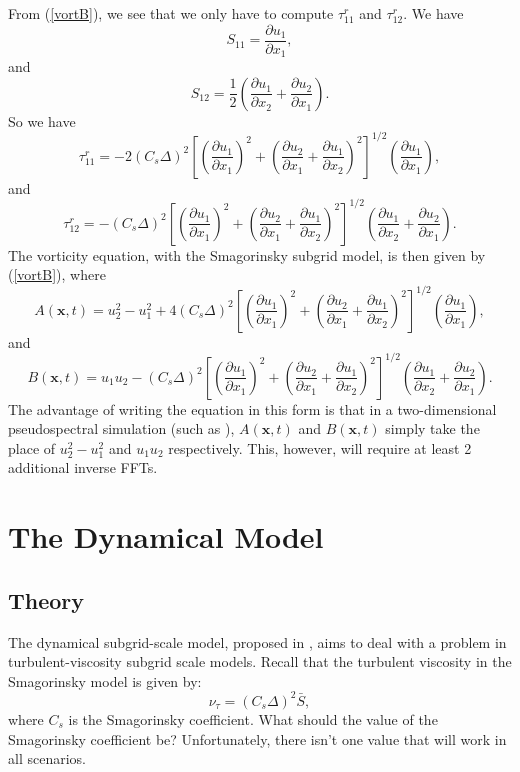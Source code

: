 \documentclass[11pt,a4paper]{article}
\newcommand{\eq}[1]{(\ref{#1})}
\begin{document}
From \eq{vortB}, we see that we only have to compute $\tau^r_{11}$ and $\tau^r_{12}$. We have 
$${S}_{11} = \frac{\partial {u}_1}{\partial x_1},$$
and
$${S}_{12} = \frac{1}{2}\left( \frac{\partial {u}_1}{\partial x_2} + \frac{\partial {u}_2}{\partial x_1}\right).$$
So we have
\begin{equation}\label{tau11}
\tau_{11}^r= -2(C_s \Delta)^2\left[\left( \frac{\partial {u}_1}{\partial x_1}\right)^2+\left( \frac{\partial {u}_2}{\partial x_1} + \frac{\partial {u}_1}{\partial x_2}\right)^2 \right]^{1/2}\left(\frac{\partial {u}_1}{\partial x_1}\right),
\end{equation}
and
\begin{equation}\label{tau12}
\tau_{12}^r= -(C_s \Delta)^2\left[\left( \frac{\partial {u}_1}{\partial x_1}\right)^2+\left( \frac{\partial {u}_2}{\partial x_1} + \frac{\partial {u}_1}{\partial x_2}\right)^2 \right]^{1/2}\left( \frac{\partial {u}_1}{\partial x_2} + \frac{\partial {u}_2}{\partial x_1}\right).
\end{equation}
The vorticity equation, with the Smagorinsky subgrid model, is then given by \eq{vortB}, where
$$A(\boldsymbol{x}, t) = u_2^2 - u_1^2 + 4(C_s \Delta)^2\left[\left( \frac{\partial {u}_1}{\partial x_1}\right)^2+\left( \frac{\partial {u}_2}{\partial x_1} + \frac{\partial {u}_1}{\partial x_2}\right)^2 \right]^{1/2}\left(\frac{\partial {u}_1}{\partial x_1}\right),$$
and
$$B(\boldsymbol{x}, t) = u_1u_2 -(C_s \Delta)^2\left[\left( \frac{\partial {u}_1}{\partial x_1}\right)^2+\left( \frac{\partial {u}_2}{\partial x_1} + \frac{\partial {u}_1}{\partial x_2}\right)^2 \right]^{1/2}\left( \frac{\partial {u}_1}{\partial x_2} + \frac{\partial {u}_2}{\partial x_1}\right).$$
The advantage of writing the equation in this form is that in a two-dimensional pseudospectral simulation (such as ), $A(\boldsymbol{x},t)$ and $B(\boldsymbol{x},t)$ simply take the place of $u_2^2 - u_1^2$ and $u_1u_2$ respectively. This, however, will require at least 2 additional inverse FFTs.
\section{The Dynamical Model}
\subsection{Theory}
The dynamical subgrid-scale model, proposed in \cite{GermanoEtAl1991}, aims to deal with a problem in turbulent-viscosity subgrid scale models. Recall that the turbulent viscosity in the Smagorinsky model is given by:
$$\nu_\tau = (C_s\Delta)^2\bar{S},$$
where $C_s$ is the Smagorinsky coefficient. What should the value of the Smagorinsky coefficient be? Unfortunately, there isn't one value that will work in all scenarios. 
\end{document}
